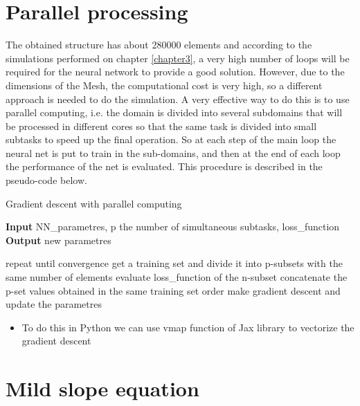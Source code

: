 \section{Parallel processing}
The obtained structure has about 280000 elements and according to the simulations performed on chapter \ref{chapter3}, a very high number of loops will be required for the neural network to provide a good solution. However, due to the dimensions of the Mesh, the computational cost is very high, so a different approach is needed to do the simulation.
A very effective way to do this is to use parallel computing, i.e. the domain is divided into several subdomains that will be processed in different cores so that the same task is divided into small subtasks to speed up the final operation. 
So at each step of the main loop the neural net is put to train in the sub-domains, and then at the end of each loop the performance of the net is evaluated.
This procedure is described in the pseudo-code below.
\begin{algorithm}[H]
    \caption*{Gradient descent with parallel computing}
    \hspace*{\algorithmicindent} \textbf{Input}  NN\_parametres, p the number of simultaneous subtasks, loss\_function\\
    \hspace*{\algorithmicindent} \textbf{Output} new parametres
    \begin{algorithmic}
    \STATE repeat until convergence
        \bindent 
        \STATE get a training set and divide it into p-subsets with the same number of elements 
            \STATE evaluate loss\_function of the n-subset
        \ENDFOR
        \STATE concatenate the p-set values obtained in the same training set order
        \STATE make gradient descent and update the parametres  
        \eindent
    \end{algorithmic}
    \end{algorithm}
    
\begin{itemize}
    \item To do this in Python we can use vmap function of Jax library to vectorize the gradient descent
\end{itemize}

\section{Mild slope equation}